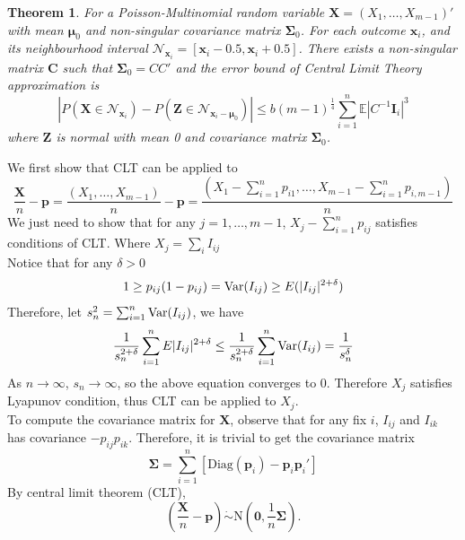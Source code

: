 \documentclass[12pt]{article}
\newcommand{\zerovec}{{\boldsymbol{0}}}
\newcommand{\EE}{\mathbb{E}}
\newcommand{\Xmat}{\mathbf{X}}
\newcommand{\Var}{{\rm Var}}
\newcommand{\N}{\textrm{N}}
\newcommand{\diag}{\textrm{Diag}}
\newcommand{\pvec}{\boldsymbol{p}}
\newtheorem{thm}{Theorem}
\begin{document}
\begin{thm}
For a Poisson-Multinomial random variable $\Xmat = (X_1,\dots,X_{m-1})'$ with mean $\boldsymbol{\mu}_0$ and non-singular covariance matrix $\boldsymbol{\Sigma}_0$. For each outcome $\boldsymbol{\boldsymbol{x}}_i$, and its neighbourhood interval $\mathcal{N}_{\boldsymbol{\boldsymbol{x}}_i} = [\boldsymbol{\boldsymbol{x}}_i-0.5,\boldsymbol{\boldsymbol{x}}_i+0.5]$. There exists a non-singular matrix $\boldsymbol{C}$ such that $\boldsymbol{\Sigma}_0 = CC'$ and the error bound of Central Limit Theory approximation is
\begin{equation*}
    |P(\Xmat \in \mathcal{N}_{\boldsymbol{x}_i}) - P(\boldsymbol{Z} \in \mathcal{N}_{\boldsymbol{x}_i-\boldsymbol{\mu}_0})| \leq b (m-1)^{\frac{1}{4}} \sum_{i=1}^{n}\EE|C^{-1}\boldsymbol{I}_{i}|^3
\end{equation*}
where $\boldsymbol{Z}$ is normal with mean 0 and covariance matrix $\boldsymbol{\Sigma}_0$.
\end{thm}
We first show that CLT can be applied to
\begin{equation*}
\frac{\Xmat}{n} - \pvec = \frac{(X_1,\dots,X_{m-1})}{n} - \pvec = \frac{(X_1 - \sum_{i=1}^{n}p_{i1},\dots,X_{m-1} - \sum_{i=1}^{n}p_{i,m-1})}{n}
\end{equation*}
We just need to show that for any $j = 1,\dots,m-1$, $X_j - \sum_{i=1}^{n}p_{ij}$ satisfies conditions of CLT. Where $X_{j} = \sum_i I_{ij}$ \\
Notice that for any $\delta > 0$
\begin{equation*}
    1\geq p_{ij}(1-p_{ij}) = \Var (I_{ij}) \geq E(|I_{ij}|^{2+ \delta})
\end{equation*}
Therefore, let $s_n^2 = \sum_{i=1}^{n}\Var(I_{ij})$, we have
\begin{equation*}
    \frac{1}{s_n^{2+\delta}}\sum_{i=1}^{n}E|I_{ij}|^{2 + \delta} \leq  \frac{1}{s_n^{2+\delta}}\sum_{i=1}^{n}\Var(I_{ij}) = \frac{1}{s_n^\delta}
\end{equation*}
As $n \rightarrow \infty$, $s_n \rightarrow \infty$, so the above equation converges to 0. Therefore $X_j$ satisfies Lyapunov condition, thus CLT can be applied to $X_j$.\\
To compute the covariance matrix for $\Xmat$,
observe that for any fix $i$, $I_{ij}$ and $I_{ik}$ has covariance $-p_{ij}p_{ik}$. Therefore, it is trivial to get the covariance matrix $$\boldsymbol{\Sigma}=\sum_{i=1}^n[\diag(\pvec_i)-\pvec_i\pvec_i']$$
By central limit theorem (CLT),
$$\left(\frac{\Xmat}{n}-\pvec\right)\dot\sim \N\left(\zerovec, \frac{1}{n}\boldsymbol{\Sigma}\right).$$\\
\end{document}

